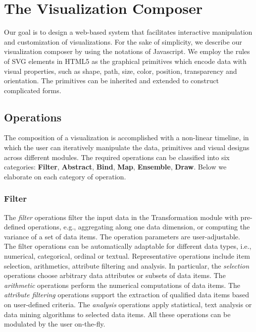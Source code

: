 \section{The Visualization Composer}
\label{sec:composer}

Our goal is to design a web-based system that facilitates interactive manipulation and customization of visualizations. For the sake of simplicity, we describe our visualization composer by using the notations of Javascript. We employ the rules of SVG elements in HTML5 as the graphical primitives which encode data with visual properties, such as shape, path, size, color, position, transparency and orientation. The primitives can be inherited and extended to construct complicated forms.

\subsection{Operations}
The composition of a visualization is accomplished with a non-linear timeline, in which the user can iteratively manipulate the data, primitives and visual designs across different modules.  The required operations can be classified into six categories: \textbf{Filter}, \textbf{Abstract}, \textbf{Bind}, \textbf{Map}, \textbf{Ensemble}, \textbf{Draw}.  Below we elaborate on each category of operation.


\subsubsection{Filter}
The \emph{filter} operations filter the input data in the Transformation module with pre-defined operations, e.g., aggregating along one data dimension, or computing the variance of a set of data items.  The operation parameters are user-adjustable.  %
 The filter operations  can be automatically adaptable for different data types, i.e., numerical, categorical, ordinal or textual. Representative operations include item selection, arithmetics, attribute filtering and analysis. In particular, the \emph{selection} operations choose arbitrary data
 attributes or subsets of data items. The \emph{arithmetic} operations perform the numerical computations of data items. The \emph{attribute filtering} operations support the extraction of qualified data items
 based on user-defined criteria. The \emph{analysis} operations apply statistical, text analysis or data mining algorithms to selected data items. All these operations can be modulated by the user on-the-fly.

